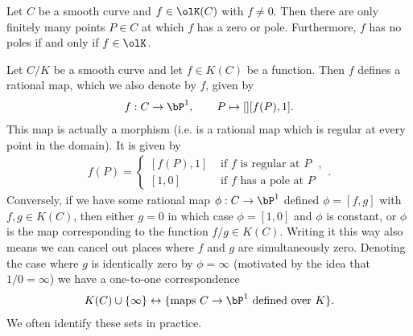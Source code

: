 \begin{prop}\label{prop:finitely-many-points-where-f-has-zero-or-pole}
	Let $C$ be a smooth curve and $f \in \olK(C)$ with $f \neq 0$. Then there are only finitely many points $P \in C$ at which $f$ has a zero or pole. Furthermore, $f$ has no poles if and only if $f \in \olK$.
\end{prop}

\begin{example}\label{exmp:rational-function-defines-morphism}
	Let $C/K$ be a smooth curve and let $f \in K(C)$ be a function. Then $f$ defines a rational map, which we also denote by $f$, given by
	\begin{align*}
		f:C\to \bP^1,\hspace{2em} P\mapsto[] [f(P),1].
	\end{align*}
	This map is actually a morphism (i.e. is a rational map which is regular at every point in the domain). It is given by
	\begin{align*}
		f(P) = 
		\begin{cases}
			[f(P),1] & \text{ if $f$ is regular at $P$ }, \\
			[1,0] & \text{ if $f$ has a pole at $P$ }
		\end{cases}.
	\end{align*}
	Conversely, if we have some rational map $\phi:C\to \bP^1$ defined $\phi = [f,g]$ with $f,g \in K(C)$, then either $g = 0$ in which case $\phi = [1,0]$ and $\phi$ is constant, or $\phi$ is the map corresponding to the function $f/g \in K(C)$. Writing it this way also means we can cancel out places where $f$ and $g$ are simultaneously zero. Denoting the case where $g$ is identically zero by $\phi = \infty$ (motivated by the idea that $1/0 = \infty$) we have a one-to-one correspondence
	\begin{align*}
		K(C) \cup \{\infty\} \leftrightarrow \{\text{maps $C\to \bP^1$ defined over $K$}\}.
	\end{align*}
	We often identify these sets in practice.
\end{example}

